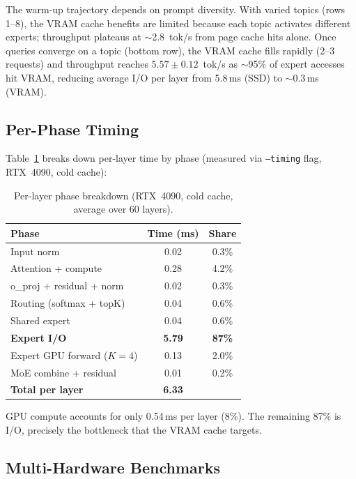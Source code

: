 \documentclass[10pt]{article}
\begin{document}
The warm-up trajectory depends on prompt diversity. With varied topics (rows 1--8), the VRAM cache benefits are limited because each topic activates different experts; throughput plateaus at $\sim$2.8~tok/s from page cache hits alone. Once queries converge on a topic (bottom row), the VRAM cache fills rapidly (2--3 requests) and throughput reaches $5.57 \pm 0.12$~tok/s as $\sim$95\% of expert accesses hit VRAM, reducing average I/O per layer from 5.8\,ms (SSD) to $\sim$0.3\,ms (VRAM).

\subsection{Per-Phase Timing}

Table~\ref{tab:timing} breaks down per-layer time by phase (measured via \texttt{--timing} flag, RTX~4090, cold cache):

\begin{table}[h]
\centering
\small
\caption{Per-layer phase breakdown (RTX~4090, cold cache, average over 60 layers).}
\label{tab:timing}
\begin{tabular}{lcc}
\toprule
\textbf{Phase} & \textbf{Time (ms)} & \textbf{Share} \\
\midrule
Input norm & 0.02 & 0.3\% \\
Attention + compute & 0.28 & 4.2\% \\
o\_proj + residual + norm & 0.02 & 0.3\% \\
Routing (softmax + topK) & 0.04 & 0.6\% \\
Shared expert & 0.04 & 0.6\% \\
\textbf{Expert I/O} & \textbf{5.79} & \textbf{87\%} \\
Expert GPU forward ($K=4$) & 0.13 & 2.0\% \\
MoE combine + residual & 0.01 & 0.2\% \\
\midrule
\textbf{Total per layer} & \textbf{6.33} & \\
\bottomrule
\end{tabular}
\end{table}

GPU compute accounts for only 0.54\,ms per layer (8\%). The remaining 87\% is I/O, precisely the bottleneck that the VRAM cache targets.

\subsection{Multi-Hardware Benchmarks}
\end{document}
